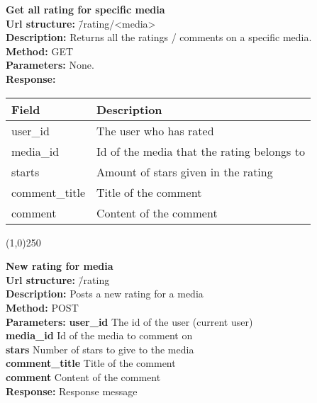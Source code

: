 \documentclass[11pt]{article}
\begin{document}
\begin{tabbing}
\textbf{Get all rating for specific media} \\
\textcolor{black!60}{\textbf{Url structure:}} \hspace{0.2in} \= /rating/<media> \\
\textcolor{black!60}{\textbf{Description:}}  \> Returns all the ratings / comments on a specific media. \\
\textcolor{black!60}{\textbf{Method:}} \> GET \\
\textcolor{black!60}{\textbf{Parameters:}} \> None. \\
\textcolor{black!60}{\textbf{Response:}} \\ \>
\begin{tabular}{|l|l|}
\hline
 Field                       &  Description                                 \\
\hline
 user\_id        &  The user who has rated                      \\
 media\_id       &  Id of the media that the rating belongs to  \\
 starts                      &  Amount of stars given in the rating         \\
 comment\_title  &  Title of the comment                        \\
 comment                     &  Content of the comment                      \\
\hline
\end{tabular}
\end{tabbing}

\begin{center}\line(1,0){250}\end{center}

\begin{tabbing}
\textbf{New rating for media} \\
\textcolor{black!60}{\textbf{Url structure:}} \hspace{0.2in} \= /rating \\
\textcolor{black!60}{\textbf{Description:}}  \> Posts a new rating for a media \\
\textcolor{black!60}{\textbf{Method:}} \> POST \\
\textcolor{black!60}{\textbf{Parameters:}} \> \textbf{user\_id} The id of the user (current user) \\
\> \textbf{media\_id} Id of the media to comment on \\
\> \textbf{stars} Number of stars to give to the media \\
\> \textbf{comment\_title} Title of the comment \\
\> \textbf{comment} Content of the comment \\
\textcolor{black!60}{\textbf{Response:}} \> Response message
\end{tabbing}
\end{document}
